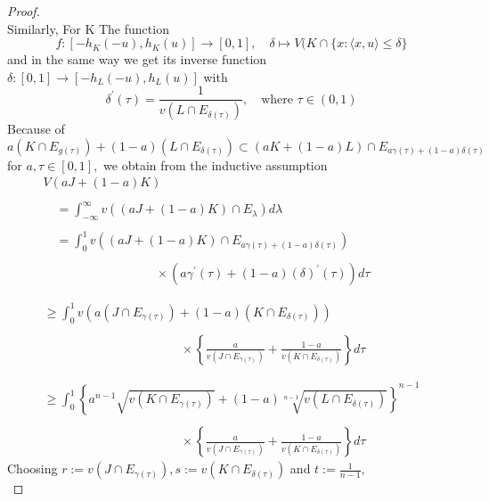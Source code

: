 \documentclass[oneside]{book}
\begin{document}
\begin{proof}
\[		\]
		Similarly, For K
		The function
		\[
		f:\left[-h_{K}(-u), h_{K}(u)\right] \rightarrow[0,1], \quad \delta \mapsto V(K \cap\{x:\langle x, u\rangle \leq  \delta \}
		\]
		and in the same way
		we get its inverse function $ \delta:[0,1] \rightarrow\left[-h_{L}(-u), h_{L}(u)\right]$     with 
		\[
		\delta^{\prime}(\tau)=\frac{1}{v\left(L \cap E_{\delta(\tau)}\right)}, \quad  \text{where } \tau \in(0,1)
		\]
		Because of
		\[
		a\left(K \cap E_{g(\tau)}\right)+(1-a)\left(L \cap E_{\delta(\tau)}\right) \subset(a K+(1-a) L) \cap E_{a \gamma(\tau)+(1-a) \delta(\tau)}
		\]
		for $a, \tau \in[0,1],$ we obtain from the inductive assumption
		\[
		\begin{array}{l}
		V(a J+(1-a) K) \\\\
		\quad=\int_{-\infty}^{\infty} v\left((a J+(1-a) K) \cap E_{\lambda}\right) d \lambda \\\\
		\quad=\int_{0}^{1} v\left((a J+(1-a) K) \cap E_{a \gamma(\tau)+(1-a) \delta(\tau)}\right) \\\\
		\quad  \quad \quad \quad \quad \quad \quad \quad \quad \times
		\left(a \gamma^{\prime}(\tau)+(1-a) (\delta)^{\prime}(\tau)\right) d \tau
		\\\\\\
		\geq \int_{0}^{1} v\left(a\left(J \cap E_{\gamma(\tau)}\right)+(1-a)\left(K \cap E_{\delta(\tau)}\right)\right)
		\\\\
		\quad \quad \quad \quad \quad \quad \quad \quad \quad \quad \quad
		
		\times
		
		\left\{\frac{a}{v\left(J \cap E_{\gamma(\tau)}\right)}+\frac{1-a}{v\left(K \cap E_{\delta(\tau)}\right)}\right\} d \tau \\\\\\
		\geq \int_{0}^{1} \left\{  a^{n-1} \sqrt{v\left(K \cap E_{\gamma(\tau)}\right)}+(1-a) \sqrt[n-1]{v\left(L \cap E_{\delta(\tau)}\right)} \right\}^{n-1} \\\\
		\quad \quad \quad \quad \quad \quad \quad \quad \quad \quad \quad \times \left\{ \frac{a}{v\left(J \cap E_{\gamma(\tau)}\right)}+\frac{1-a}{v\left(K \cap E_{\delta(\tau)}\right)}\right\} d \tau
		\end{array}
		\]
		Choosing $r:=v\left(J \cap E_{\gamma(\tau)}\right), s:=v\left(K \cap E_{\delta(\tau)}\right)$ and $t:=\frac{1}{n-1},$
		\\
		

\end{proof}
\end{document}
